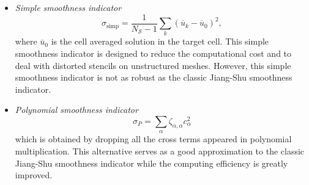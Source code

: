 \documentclass[usenames,dvipsnames,letterpaper,landscape,final]{slides}
\theoremstyle{definition}
\begin{document}
\begin{myslide}
\begin{itemize}
		  \item \textit{Simple smoothness indicator}
\begin{equation*}\label{eq:simpsmoothnessIC}
\sigma_{\text{simp}} = \frac{1}{N_\mathcal{S} -1 } \sum_k (\overline{u}_k - \overline{u}_0)^2,
\end{equation*}
where $\overline{u}_0$ is the cell averaged solution in the target cell.
This simple smoothness indicator is designed to reduce the computational cost and to deal with
distorted stencils on unstructured meshes. However, this simple smoothness indicator is not as robust
as the classic Jiang-Shu smoothness indicator.

\vspace{0.5cm}

\item \textit{Polynomial smoothness indicator}
		  \begin{equation*}\label{eq:polysigma}
					 \sigma_{P} = \sum_{\alpha} \zeta_{\alpha, \alpha} c_{\alpha}^2
		  \end{equation*}
		  which is obtained by dropping all the cross terms appeared in polynomial multiplication. %
		  This alternative serves as a good approximation to the classic Jiang-Shu smoothness indicator while the 
		  computing efficiency is greatly improved.
\end{itemize}

\end{myslide}
\end{document}
